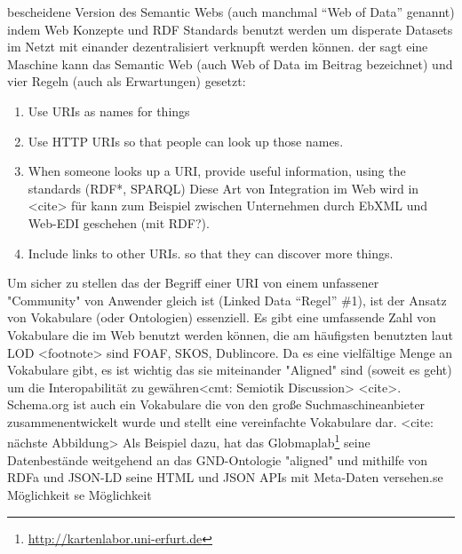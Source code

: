 \citeauthor[S.~61]{dewilde2015information} bescheidene Version des Semantic Webs (auch manchmal \hyphenquote{german}{Web of Data} genannt) indem Web Konzepte und RDF Standards benutzt werden um disperate Datasets im Netzt mit einander dezentralisiert verknupft werden können.  der sagt eine Maschine kann das Semantic Web (auch Web of Data im Beitrag bezeichnet) und vier Regeln (auch als Erwartungen) gesetzt: 

\begin{enumerate}
	\item Use URIs as names for things
	\item Use HTTP URIs so that people can look up those names.
	\item When someone looks up a URI, provide useful information, using the standards (RDF*, SPARQL) Diese Art von Integration im Web wird in <cite> für kann zum Beispiel zwischen Unternehmen durch EbXML und Web-EDI geschehen (mit RDF?).
	\item Include links to other URIs. so that they can discover more things.
\end{enumerate}

Um sicher zu stellen das der Begriff einer URI von einem unfassener "Community" von Anwender gleich ist (Linked Data \hyphenquote{german}{Regel} \#1), ist der Ansatz von Vokabulare (oder Ontologien) essenziell. Es gibt eine umfassende Zahl von Vokabulare die im Web benutzt werden können, die am häufigsten benutzten laut LOD <footnote> sind FOAF, SKOS, Dublincore. Da es eine vielfältige Menge an Vokabulare gibt, es ist wichtig das sie miteinander "Aligned" sind (soweit es geht) um die Interopabilität zu gewähren<cmt: Semiotik Discussion> <cite>. Schema.org ist auch ein Vokabulare die von den große Suchmaschineanbieter zusammenentwickelt wurde und stellt eine vereinfachte Vokabulare dar. <cite: nächste Abbildung> Als Beispiel dazu, hat das Globmaplab\footnote{\url{http://kartenlabor.uni-erfurt.de}} seine Datenbestände weitgehend an das GND-Ontologie "aligned" und mithilfe von RDFa und JSON-LD seine HTML und JSON APIs mit Meta-Daten versehen.se Möglichkeit 
se Möglichkeit 




